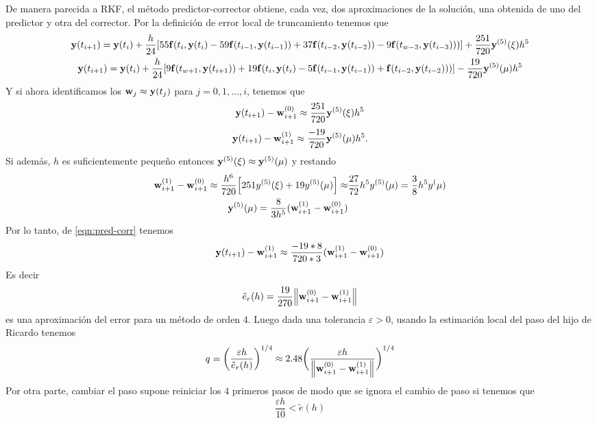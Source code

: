 De manera parecida a RKF, %
el método predictor-corrector obtiene, cada vez,
dos aproximaciones de la solución,
una obtenida de uno del predictor y otra del corrector.
Por la definición de error local de truncamiento tenemos que
\begin{gather*}
    \vb{y}{}(t_{i+1}) = \vb{y}{}(t_i) + \frac{h}{24}[
        55\vb{f}{}(t_i,\vb{y}{}(t_i) - 59\vb{f}{}(t_{i-1},\vb{y}{}(t_{i-1})) + 37\vb{f}{}(t_{i-2}, \vb{y}{}(t_{i-2}))
        - 9\vb{f}{}(t_{w-3},\vb{y}{}(t_{i-3})))
    ] + \frac{251}{720}\vb{y}{}^{(5)}(\xi)h^5  \\
    \vb{y}{}(t_{i+1}) = \vb{y}{}(t_i) + \frac{h}{24}[
        9\vb{f}{}(t_{w+1},\vb{y}{}(t_{i+1})) + 19\vb{f}{}(t_i,\vb{y}{}(t_i) - 5\vb{f}{}(t_{i-1},\vb{y}{}(t_{i-1}))
        + \vb{f}{}(t_{i-2}, \vb{y}{}(t_{i-2})))
    ] - \frac{19}{720}\vb{y}{}^{(5)}(\mu)h^5
\end{gather*}
Y si ahora identificamos los $\vb{w}{}_j \approx \vb{y}{}(t_j)$ para $j = 0,1,\dots, i$,
tenemos que
\begin{equation*} 
    \vb{y}{}(t_{i+1}) - \vb{w}{}_{i+1}^{(0)} \approx {} 
        \frac{251}{720}\vb{y}{}^{(5)}(\xi)h^5
\end{equation*}
\begin{equation} \label{eqn:pred-corr}
    \vb{y}{}(t_{i+1}) - \vb{w}{}_{i+1}^{(1)} \approx {} 
        \frac{-19}{720}\vb{y}{}^{(5)}(\mu)h^5.
\end{equation}
Si además, $h$ es suficientemente pequeño entonces
$\vb{y}{}^{(5)}(\xi) \approx \vb{y}{}^{(5)}(\mu)$
y restando
\begin{align*}
    \vb{w}{}_{i+1}^{(1)} - \vb{w}{}_{i+1}^{(0)} \approx 
        \frac{h^6}{720}\qty[251y^{(5)}(\xi) + 19y^{(5)}(\mu)] \approx &
        \frac{27}{72}h^5y^{(5)}(\mu) = \frac{3}{8}h^5y^(\mu) \\
    \vb{y}{}^{(5)}(\mu) = \frac{8}{3h^5}(\vb{w}{}_{i+1}^{(1)} - \vb{w}{}_{i+1}^{(0)}) &
\end{align*}
Por lo tanto, de \ref{eqn:pred-corr} tenemos
\begin{equation*}
    \vb{y}{}(t_{i+1}) - \vb{w}{}_{i+1}^{(1)} \approx \frac{-19 * 8}{720 * 3}(\vb{w}{}_{i+1}^{(1)} - \vb{w}{}_{i+1}^{(0)})
\end{equation*}
Es decir
\begin{equation*}
    \tilde{e}_r(h) = \frac{19}{270}\norm{\vb{w}{}_{i+1}^{(0)} - \vb{w}{}_{i+1}^{(1)}}   
\end{equation*}
es una aproximación del error para un método de orden 4.
Luego dada una tolerancia $\varepsilon > 0$, usando la estimación
local del paso del hijo de Ricardo tenemos
\begin{equation*}
    q = \bigg(\frac{\varepsilon h}{\tilde{e}_r(h)}\bigg)^{1/4} \approx 
        2.48\bigg(\frac{\varepsilon h}{\norm{\vb{w}{}_{i+1}^{(0)} - \vb{w}{}_{i+1}^{(1)}}}\bigg)^{1/4}
\end{equation*}
Por otra parte, cambiar el paso supone reiniciar los
$4$ primeros pasos de modo que se ignora el cambio de paso 
si tenemos que 
\begin{equation*}
    \frac{\varepsilon h}{10} < \tilde{e}(h)
\end{equation*}

